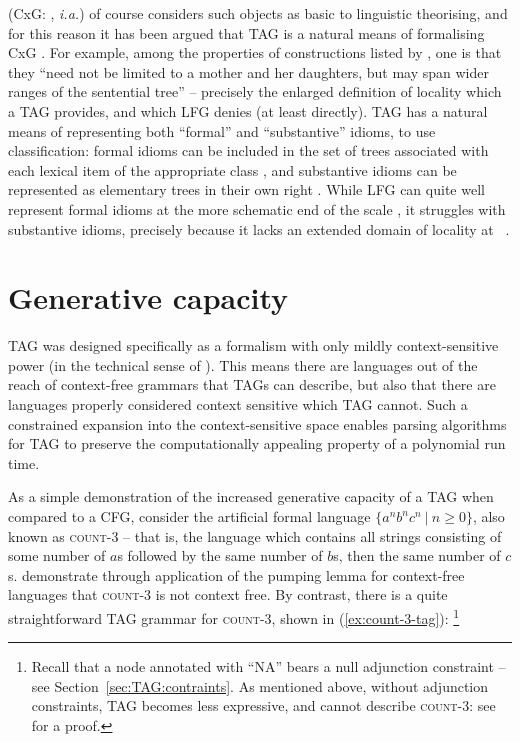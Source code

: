 \documentclass[output=paper,hidelinks]{langscibook}
\begin{document}
 (CxG:
\citealt{FillmoreKayOConnor1988,goldberg1995constructions,Goldberg2006,KayFillmore1999,BoasSag2012,HoffmannTrousdale2013},
\textit{i.a.}) of course considers such objects as basic to linguistic
theorising, and for this reason it has been argued that TAG is a natural means
of formalising CxG \citep{lichte:tag-cxg}. For example, among the properties of
constructions listed by \citet[501]{FillmoreKayOConnor1988}, one is that they
``need not be limited to a mother and her daughters, but may span wider ranges
of the sentential tree'' -- precisely the enlarged definition of locality which
a TAG provides, and which LFG denies (at least directly). TAG has a natural
means of representing both ``formal'' and ``substantive'' idioms, to use
 classification: formal idioms can be
included in the set of trees associated with each lexical item of the
appropriate class \citep[208f.]{lichte:tag-cxg}, and substantive idioms can be
represented as elementary trees in their own right \citep{abeille1995}. While
LFG can quite well represent formal idioms at the more schematic end of the
scale \citep[see e.g.][]{asudeh2013constructions}, it struggles with substantive
idioms, precisely because it lacks an extended domain of locality at \cstruc\
\citep[sec.~4]{findlay:lfg-as-cxg}.


\section{Generative capacity}\label{sec:TAG:generative-capacity}

TAG was designed specifically as a formalism with only mildly context-sensitive
power (in the technical sense of \citealt{joshi1985}). This means there are
languages out of the reach of context-free grammars that TAGs can describe, but
also that there are languages properly considered context sensitive which TAG
cannot. Such a constrained expansion into the context-sensitive space enables
parsing algorithms for TAG to preserve the computationally appealing property of
a polynomial run time.

As a simple demonstration of the increased generative capacity of a TAG when
compared to a CFG, consider the artificial formal language
$\{a^nb^nc^n\ \vert\ n \geq 0\}$, also known as \textsc{count-3} -- that is, the
language which contains all strings consisting of some number of $a$s followed
by the same number of $b$s, then the same number of $c$s.
\citet[497]{partee-etal1990} demonstrate through application of the pumping
lemma for context-free languages that \textsc{count-3} is not context free. By
contrast, there is a quite straightforward TAG grammar for \textsc{count-3},
shown in (\ref{ex:count-3-tag}):%
%
\footnote{Recall that a node annotated with ``NA'' bears a null adjunction
  constraint -- see Section~\ref{sec:TAG:contraints}. As mentioned above, without
  adjunction constraints, TAG becomes less expressive, and cannot describe
  \textsc{count-3}: see \citet[222]{Kallmeyer2010} for a proof.}
%
\end{document}
